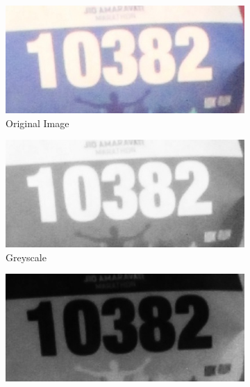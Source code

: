 \begin{figure}[h]
  \centering
  \begin{subfigure}[b]{0.23\textwidth}
    \includegraphics[width=\textwidth]{images/processing/ocr/10382_org}
    \caption{Original Image}
    \label{fig:processing_pipeline:ocr_postprocessing:white_on_dark_original}
  \end{subfigure}
  \hspace{\fill}
  \begin{subfigure}[b]{0.23\textwidth}
    \includegraphics[width=\textwidth]{images/processing/ocr/10382_bw}
    \caption{Greyscale}
  \end{subfigure}
  \hspace{\fill}
  \begin{subfigure}[b]{0.23\textwidth}
    \includegraphics[width=\textwidth]{images/processing/ocr/10382_bw_inv}

\end{subfigure}
\end{figure}
